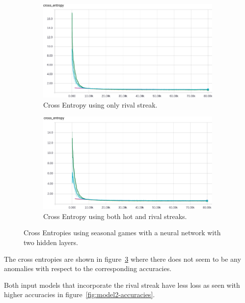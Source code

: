 \documentclass{article} %
\begin{document}
\begin{figure}[!htb]
  \begin{subfigure}{0.5\textwidth}
    \includegraphics[width=\linewidth]{plots/model2/streak-r/crossentropy.png}
    \caption{Cross Entropy using only rival streak.}\label{fig:model2-r-crossentropy}
  \end{subfigure}
  \begin{subfigure}{0.5\textwidth}
    \includegraphics[width=\linewidth]{plots/model2/streak-hr/crossentropy.png}
    \caption{Cross Entropy using both hot and rival streaks.}\label{fig:model2-hr-crossentropy}
  \end{subfigure}
  \caption{Cross Entropies using seasonal games with a neural network with two hidden layers.}
  \label{fig:model2-crossentropies}
\end{figure}

The cross entropies are shown in figure~\ref{fig:model2-crossentropies} where there does not seem to be any anomalies with respect to the corresponding accuracies.

Both input models that incorporate the rival streak have less loss as seen with higher accuracies in figure~\ref{fig:model2-accuracies}.
\end{document}
